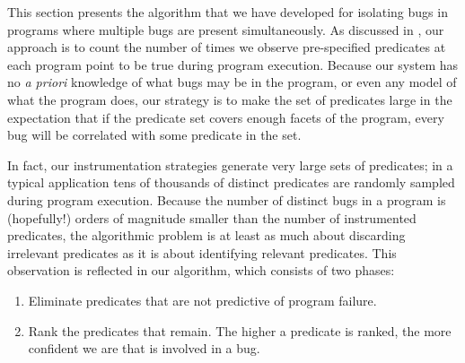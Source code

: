 

This section presents the algorithm that we have developed for
isolating bugs in programs where multiple bugs are present
simultaneously.  As discussed in , our
approach is to count the number of times we observe pre-specified
predicates at each program point to be true during program
execution.  Because our system has no \textit{a priori} knowledge of
what bugs may be in the program, or even any model of what the program
does, our strategy is to make the set of predicates large in the
expectation that if the predicate set covers enough facets of the
program, every bug will be correlated with some predicate in the set.

In fact, our instrumentation strategies generate very large sets
of predicates; in a typical application tens of thousands of distinct
predicates are randomly sampled during program execution.  Because the
number of distinct bugs in a program is (hopefully!) orders of
magnitude smaller than the number of instrumented predicates, the
algorithmic problem is at least as much about discarding irrelevant
predicates as it is about identifying relevant predicates.  This
observation is reflected in our algorithm, which consists of two phases:
\begin{enumerate}
\item Eliminate predicates that are not predictive of program failure.

\item Rank the predicates that remain.  The higher a predicate is ranked,
the more confident we are that is involved in a bug.
\end{enumerate}

